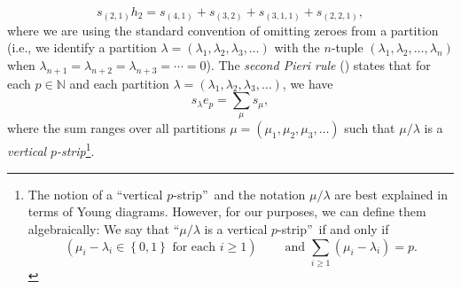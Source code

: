 \documentclass
[numbers=enddot,12pt,final,onecolumn,notitlepage,english]{scrartcl}%
\theoremstyle{definition}
\let\sumnonlimits\sum
\renewcommand{\sum}{\sumnonlimits\limits}
\begin{document}
\[
s_{\left(  2,1\right)  }h_{2}=s_{\left(  4,1\right)  }+s_{\left(  3,2\right)
}+s_{\left(  3,1,1\right)  }+s_{\left(  2,2,1\right)  },
\]
where we are using the standard convention of omitting zeroes from a partition
(i.e., we identify a partition $\lambda=\left(  \lambda_{1},\lambda
_{2},\lambda_{3},\ldots\right)  $ with the $n$-tuple $\left(  \lambda
_{1},\lambda_{2},\ldots,\lambda_{n}\right)  $ when $\lambda_{n+1}%
=\lambda_{n+2}=\lambda_{n+3}=\cdots=0$). The \emph{second Pieri rule}
(\cite[Chapter I, (5.17)]{Macdon95}) states that for each $p\in\mathbb{N}$ and
each partition $\lambda=\left(  \lambda_{1},\lambda_{2},\lambda_{3}%
,\ldots\right)  $, we have%
\begin{equation}
s_{\lambda}e_{p}=\sum_{\mu}s_{\mu}, \label{eq.intro.pieri2}%
\end{equation}
where the sum ranges over all partitions $\mu=\left(  \mu_{1},\mu_{2},\mu
_{3},\ldots\right)  $ such that $\mu/\lambda$ is a \emph{vertical }%
$p$\emph{-strip}\footnote{The notion of a \textquotedblleft vertical
$p$-strip\textquotedblright\ and the notation $\mu/\lambda$ are best explained
in terms of Young diagrams. However, for our purposes, we can define them
algebraically: We say that \textquotedblleft$\mu/\lambda$ is a vertical
$p$-strip\textquotedblright\ if and only if
\[
\left(  \mu_{i}-\lambda_{i}\in\left\{  0,1\right\}  \text{ for each }%
i\geq1\right)  \ \ \ \ \ \ \ \ \ \ \text{and }\sum_{i\geq1}\left(  \mu
_{i}-\lambda_{i}\right)  =p.
\]
}.
\end{document}
